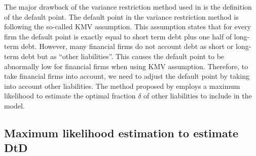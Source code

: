 The major drawback of the variance restriction method used in \citet{DSW} is the definition of the default point. The default point in the variance restriction method is following the so-called KMV assumption. This assumption states that for every firm the default point is exactly equal to short term debt plus one half of long-term debt. However, many financial firms do not account debt as short or long-term debt but as ``other liabilities''. This causes the default point to be abnormally low for financial firms when using KMV assumption. Therefore, to take financial firms into account, we need to adjust the default point by taking into account other liabilities. The method proposed by \citet{Duan2012} employs a maximum likelihood to estimate the optimal fraction $\delta$ of other liabilities to include in the model.

\subsection{Maximum likelihood estimation to estimate DtD}

